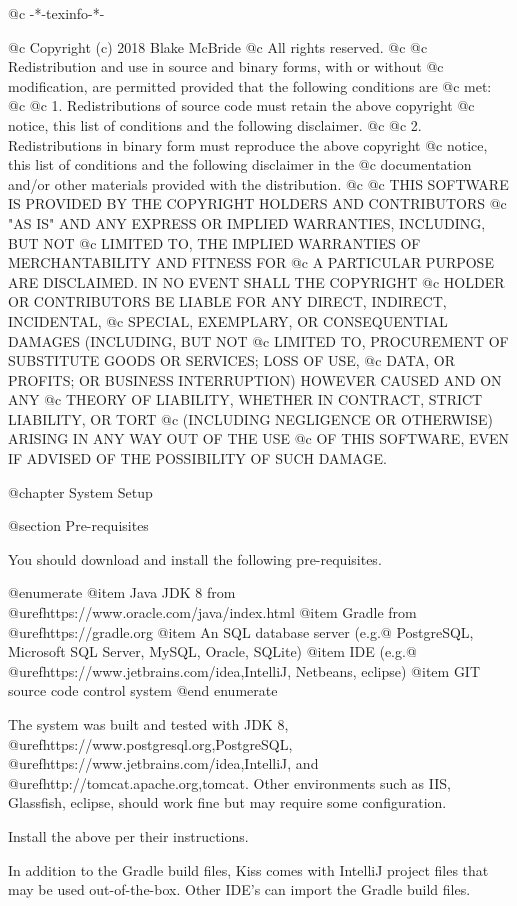 @c -*-texinfo-*-

@c  Copyright (c) 2018 Blake McBride
@c  All rights reserved.
@c
@c  Redistribution and use in source and binary forms, with or without
@c  modification, are permitted provided that the following conditions are
@c  met:
@c
@c  1. Redistributions of source code must retain the above copyright
@c  notice, this list of conditions and the following disclaimer.
@c
@c  2. Redistributions in binary form must reproduce the above copyright
@c  notice, this list of conditions and the following disclaimer in the
@c  documentation and/or other materials provided with the distribution.
@c
@c  THIS SOFTWARE IS PROVIDED BY THE COPYRIGHT HOLDERS AND CONTRIBUTORS
@c  "AS IS" AND ANY EXPRESS OR IMPLIED WARRANTIES, INCLUDING, BUT NOT
@c  LIMITED TO, THE IMPLIED WARRANTIES OF MERCHANTABILITY AND FITNESS FOR
@c  A PARTICULAR PURPOSE ARE DISCLAIMED. IN NO EVENT SHALL THE COPYRIGHT
@c  HOLDER OR CONTRIBUTORS BE LIABLE FOR ANY DIRECT, INDIRECT, INCIDENTAL,
@c  SPECIAL, EXEMPLARY, OR CONSEQUENTIAL DAMAGES (INCLUDING, BUT NOT
@c  LIMITED TO, PROCUREMENT OF SUBSTITUTE GOODS OR SERVICES; LOSS OF USE,
@c  DATA, OR PROFITS; OR BUSINESS INTERRUPTION) HOWEVER CAUSED AND ON ANY
@c  THEORY OF LIABILITY, WHETHER IN CONTRACT, STRICT LIABILITY, OR TORT
@c  (INCLUDING NEGLIGENCE OR OTHERWISE) ARISING IN ANY WAY OUT OF THE USE
@c  OF THIS SOFTWARE, EVEN IF ADVISED OF THE POSSIBILITY OF SUCH DAMAGE.


@chapter System Setup


@section Pre-requisites

You should download and install the following pre-requisites.

@enumerate
@item
Java JDK 8 from @uref{https://www.oracle.com/java/index.html}
@item
Gradle from @uref{https://gradle.org}
@item
An SQL database server (e.g.@ PostgreSQL, Microsoft SQL Server, MySQL, Oracle, SQLite)
@item
IDE (e.g.@ @uref{https://www.jetbrains.com/idea,IntelliJ}, Netbeans, eclipse)
@item
GIT source code control system
@end enumerate

The system was built and tested with JDK 8, @uref{https://www.postgresql.org,PostgreSQL}, @uref{https://www.jetbrains.com/idea,IntelliJ}, and 
@uref{http://tomcat.apache.org,tomcat}.  Other environments such as IIS, Glassfish, eclipse, should work fine but may require some configuration.

Install the above per their instructions.

In addition to the Gradle build files, Kiss comes with IntelliJ project files that may be used out-of-the-box.  Other IDE's can import the Gradle build files.

